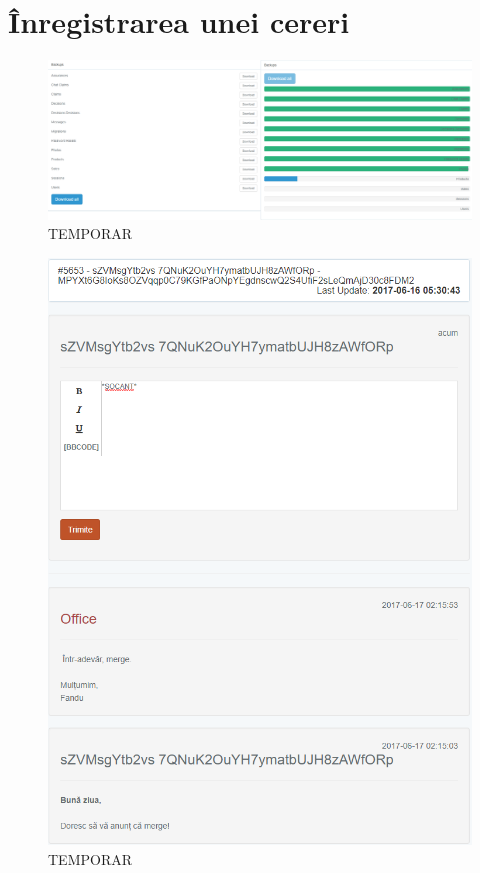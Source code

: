 \section{Înregistrarea unei cereri}


	\begin{figure}
		\includegraphics[width=\linewidth]{../imagini/backups.png}
		\caption{TEMPORAR}
		\label{fig:TEMP}
	\end{figure}
	\begin{figure}
		\includegraphics[width=\linewidth]{../imagini/claim_mesaje.png}
		\caption{TEMPORAR}
		\label{fig:TEMP}
	\end{figure}
